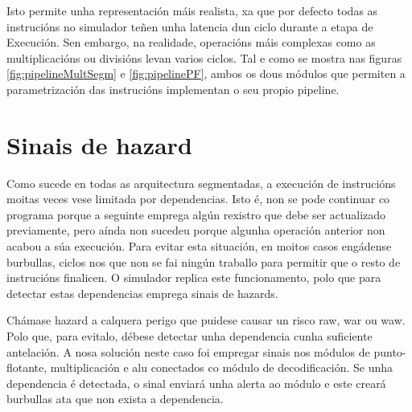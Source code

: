 Isto permite unha representación máis realista, xa que por defecto todas as instrucións no simulador teñen unha latencia dun ciclo durante a etapa de Execución. Sen embargo, na realidade, operacións máis complexas como as multiplicacións ou divisións levan varios ciclos. Tal e como se mostra nas figuras \ref{fig:pipelineMultSegm} e \ref{fig:pipelinePF}, ambos os dous módulos que permiten a parametrización das instrucións implementan o seu propio pipeline.

\section{Sinais de hazard}\label{sec:hazards}
Como sucede en todas as \gls{arquitectura} segmentadas, a execución de instrucións moitas veces vese limitada por dependencias. Isto é, non se pode continuar co programa porque a seguinte emprega algún rexistro que debe ser actualizado previamente, pero aínda non sucedeu porque algunha operación anterior non acabou a súa execución. Para evitar esta situación, en moitos casos engádense burbullas, ciclos nos que non se fai ningún traballo para permitir que o resto de instrucións finalicen. O simulador replica este funcionamento, polo que para detectar estas dependencias emprega sinais de \gls{hazards}.

Chámase hazard a calquera perigo que puidese causar un risco \acrfull{raw}, \acrfull{war} ou \acrfull{waw}. Polo que, para evitalo, débese detectar unha dependencia cunha suficiente antelación. A nosa solución neste caso foi empregar sinais nos módulos de punto-flotante, multiplicación e \acrshort{alu} conectados co módulo de decodificación. Se unha dependencia é detectada, o sinal enviará unha alerta ao módulo e este creará burbullas ata que non exista a dependencia.
